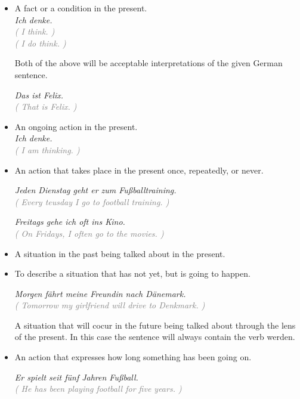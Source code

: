 \documentclass[a4paper,twocolumn,10pt]{article}
\newcommand{\newpar}
{\par \vspace{0.3cm}}
\begin{document}
\begin{itemize}[noitemsep]
	\item A fact or a condition in the present. \\

		\textit{Ich denke.}\\
		\textcolor{gray} { \textit{( I think. )} } \\
		\textcolor{gray} { \textit{( I do think. )} } \newpar
	
		Both of the above will be acceptable interpretations of the given German
		sentence.

		\textit{Das ist Felix.}\\
		\textcolor{gray} { \textit{( That is Felix. )} } \\

	\item An ongoing action in the present.\\

		\textit{Ich denke.}\\
		\textcolor{gray} { \textit{( I am thinking. )} } \newpar

	\item An action that takes place in the present once, repeatedly, or never.

		
		\noindent
		\textit{Jeden Dienstag geht er zum Fußballtraining.}\\
		\textcolor{gray} { \textit{( Every teusday I go to football training.  )} } \newpar
		


		\textit{Freitags gehe ich oft ins Kino.}\\
		\textcolor{gray} { \textit{( On Fridays, I often go to the movies. )} } \newpar
		
		
	\item A situation in the past being talked about in the present.\\
	\item To describe a situation that has not yet, but is going to happen.
		
		
		\noindent
		\textit{Morgen fährt meine Freundin nach Dänemark.}\\
		\textcolor{gray} { \textit{( Tomorrow my girlfriend will drive to
				Denkmark. )} } \newpar
		
		A situation that will cocur in the future being talked about through
		the lens of the present. In this case the sentence will always contain
		the verb werden.\\

	\item An action that expresses how long something has been going on.

		
		\noindent
		\textit{Er spielt seit fünf Jahren Fußball.}\\
		\textcolor{gray} { \textit{( He has been playing football for five
				years. )} } \newpar
		

\end{itemize}
\end{document}
